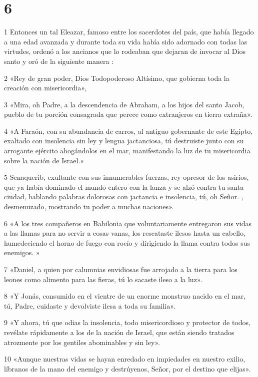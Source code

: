 \chapter{6}

\par 1 Entonces un tal Eleazar, famoso entre los sacerdotes del país, que había llegado a una edad avanzada y durante toda su vida había sido adornado con todas las virtudes, ordenó a los ancianos que lo rodeaban que dejaran de invocar al Dios santo y oró de la siguiente manera :
\par 2 «Rey de gran poder, Dios Todopoderoso Altísimo, que gobierna toda la creación con misericordia»,
\par 3 «Mira, oh Padre, a la descendencia de Abraham, a los hijos del santo Jacob, pueblo de tu porción consagrada que perece como extranjeros en tierra extraña».
\par 4 «A Faraón, con su abundancia de carros, al antiguo gobernante de este Egipto, exaltado con insolencia sin ley y lengua jactanciosa, tú destruiste junto con su arrogante ejército ahogándolos en el mar, manifestando la luz de tu misericordia sobre la nación de Israel.»
\par 5 Senaquerib, exultante con sus innumerables fuerzas, rey opresor de los asirios, que ya había dominado el mundo entero con la lanza y se alzó contra tu santa ciudad, hablando palabras dolorosas con jactancia e insolencia, tú, oh Señor. , desmenuzado, mostrando tu poder a muchas naciones».
\par 6 «A los tres compañeros en Babilonia que voluntariamente entregaron sus vidas a las llamas para no servir a cosas vanas, los rescataste ilesos hasta un cabello, humedeciendo el horno de fuego con rocío y dirigiendo la llama contra todos sus enemigos. »
\par 7 «Daniel, a quien por calumnias envidiosas fue arrojado a la tierra para los leones como alimento para las fieras, tú lo sacaste ileso a la luz».
\par 8 «Y Jonás, consumido en el vientre de un enorme monstruo nacido en el mar, tú, Padre, cuidaste y devolviste ilesa a toda su familia».
\par 9 «Y ahora, tú que odias la insolencia, todo misericordioso y protector de todos, revélate rápidamente a los de la nación de Israel, que están siendo tratados atrozmente por los gentiles abominables y sin ley».
\par 10 «Aunque nuestras vidas se hayan enredado en impiedades en nuestro exilio, líbranos de la mano del enemigo y destrúyenos, Señor, por el destino que elijas».
